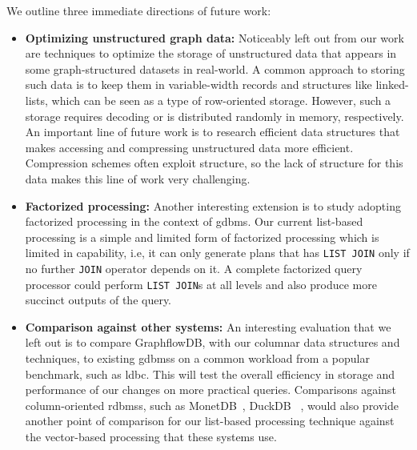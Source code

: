We outline three immediate directions of future work:
\begin{itemize}
	\item \textbf{Optimizing unstructured graph data:} Noticeably left out from our work are techniques to optimize the storage of unstructured data that appears in some graph-structured datasets in real-world. A common approach to storing such data is to keep them in variable-width records and structures like linked-lists, which can be seen as a type of row-oriented storage. However, such a storage requires decoding or is distributed randomly in memory, respectively. An important line of future work is to research efficient data structures that makes accessing and compressing unstructured data more efficient. Compression schemes often exploit structure, so the lack of structure for this data makes this line of work very challenging. %
	
	\item \textbf{Factorized processing:} Another interesting extension is to study adopting factorized processing in the context of \gls{gdbms}. Our current list-based processing is a simple and limited form of factorized processing which is limited in capability, i.e, it can only generate plans that has \texttt{LIST JOIN} only if no further \texttt{JOIN} operator depends on it. A complete factorized query processor could perform \texttt{LIST JOIN}s at all levels and also produce more succinct outputs of the query.
	
	\item \textbf{Comparison against other systems: }An interesting evaluation that we left out is to compare GraphflowDB, with our columnar data structures and techniques, to existing \gls{gdbms}s on a common workload from a popular benchmark, such as \gls{ldbc}. This will test the overall efficiency in storage and performance of our changes on more practical queries. Comparisons against column-oriented \gls{rdbms}s, such as MonetDB~\cite{monetdb}, DuckDB~\cite{duckdb} , would also provide another point of comparison for our list-based processing technique against the vector-based processing that these systems use. 
	
\end{itemize}


